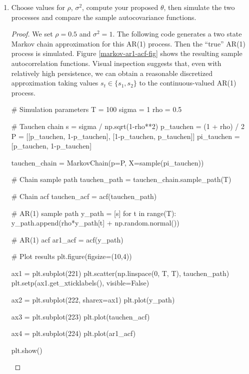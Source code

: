 \documentclass[oneside,reqno]{amsart}
\theoremstyle{definition}
\begin{document}
\begin{enumerate}[label=(\roman*)]
\begin{proof}
\begin{align*}
		&= \frac{1}{2} \frac{1+\rho^2}{2} s_1^2 + \frac{1-\rho^2}{2} s_1s_2 + \frac{1}{2} \frac{1+\rho^2}{2} s_2 \\
		&= \frac{\sigma^2}{1-\rho^2}\rho^\tau = \gamma_y(\tau),
\end{align*}
the desired result.
\end{proof}
\item
Choose values for $\rho$, $\sigma^2$, compute your proposed $\theta$, then simulate the two processes and compare the sample autocovariance functions.
\begin{proof} 
We set $\rho = 0.5$ and $\sigma^2=1$. The following code generates a two state Markov chain approximation for this AR(1) process. Then the ``true'' AR(1) process is simulated. Figure \ref{markov-ar1-acf-fig} shows the resulting sample autocorrelation functions. Visual inspection suggests that, even with relatively high persistence, we can obtain a reasonable discretized approximation taking values $s_t \in \{s_1, s_2\}$ to the continuous-valued AR(1) process.
\begin{python3code}
# Simulation parameters 
T = 100
sigma = 1
rho = 0.5

# Tauchen chain
s = sigma / np.sqrt(1-rho**2)
p_tauchen = (1 + rho) / 2
P = [[p_tauchen, 1-p_tauchen], [1-p_tauchen, p_tauchen]]
pi_tauchen = [p_tauchen, 1-p_tauchen]

tauchen_chain = MarkovChain(p=P, X=sample(pi_tauchen))

# Chain sample path
tauchen_path = tauchen_chain.sample_path(T)

# Chain acf
tauchen_acf = acf(tauchen_path)

# AR(1) sample path
y_path = [s]
for t in range(T):
    y_path.append(rho*y_path[t] + np.random.normal())

# AR(1) acf
ar1_acf = acf(y_path)

# Plot results 
plt.figure(figsize=(10,4))

ax1 = plt.subplot(221)
plt.scatter(np.linspace(0, T, T), tauchen_path)
plt.setp(ax1.get_xticklabels(), visible=False)

ax2 = plt.subplot(222, sharex=ax1)
plt.plot(y_path)

ax3 = plt.subplot(223)
plt.plot(tauchen_acf)

ax4 = plt.subplot(224)
plt.plot(ar1_acf)

plt.show()
\end{python3code}


\end{proof}
\end{enumerate}
\end{document}

